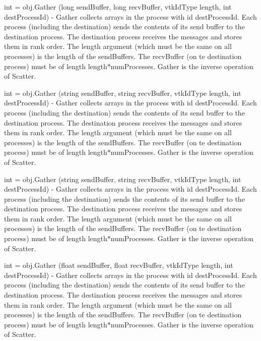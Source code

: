 \begin{DoxyItemize}
\item {\ttfamily int = obj.\-Gather (long send\-Buffer, long recv\-Buffer, vtk\-Id\-Type length, int dest\-Process\-Id)} -\/ Gather collects arrays in the process with id {\ttfamily dest\-Process\-Id}. Each process (including the destination) sends the contents of its send buffer to the destination process. The destination process receives the messages and stores them in rank order. The {\ttfamily length} argument (which must be the same on all processes) is the length of the send\-Buffers. The {\ttfamily recv\-Buffer} (on te destination process) must be of length length$\ast$num\-Processes. Gather is the inverse operation of Scatter.  
\item {\ttfamily int = obj.\-Gather (string send\-Buffer, string recv\-Buffer, vtk\-Id\-Type length, int dest\-Process\-Id)} -\/ Gather collects arrays in the process with id {\ttfamily dest\-Process\-Id}. Each process (including the destination) sends the contents of its send buffer to the destination process. The destination process receives the messages and stores them in rank order. The {\ttfamily length} argument (which must be the same on all processes) is the length of the send\-Buffers. The {\ttfamily recv\-Buffer} (on te destination process) must be of length length$\ast$num\-Processes. Gather is the inverse operation of Scatter.  
\item {\ttfamily int = obj.\-Gather (string send\-Buffer, string recv\-Buffer, vtk\-Id\-Type length, int dest\-Process\-Id)} -\/ Gather collects arrays in the process with id {\ttfamily dest\-Process\-Id}. Each process (including the destination) sends the contents of its send buffer to the destination process. The destination process receives the messages and stores them in rank order. The {\ttfamily length} argument (which must be the same on all processes) is the length of the send\-Buffers. The {\ttfamily recv\-Buffer} (on te destination process) must be of length length$\ast$num\-Processes. Gather is the inverse operation of Scatter.  
\item {\ttfamily int = obj.\-Gather (float send\-Buffer, float recv\-Buffer, vtk\-Id\-Type length, int dest\-Process\-Id)} -\/ Gather collects arrays in the process with id {\ttfamily dest\-Process\-Id}. Each process (including the destination) sends the contents of its send buffer to the destination process. The destination process receives the messages and stores them in rank order. The {\ttfamily length} argument (which must be the same on all processes) is the length of the send\-Buffers. The {\ttfamily recv\-Buffer} (on te destination process) must be of length length$\ast$num\-Processes. Gather is the inverse operation of Scatter.  

\end{DoxyItemize}
